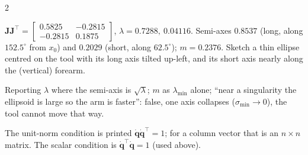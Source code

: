 \begin{multicols}{2}
\begin{worked}[equal links $L_1=L_2=0.5$ m, $q_2=110^\circ$ (any $q_1$)]
\end{worked}
\begin{worked}[$L=(0.5,0.4)$ m, $\mathbf q=(30^\circ,60^\circ)$: what to draw]
$\mathbf J\mathbf J^\top=\begin{bmatrix}0.5825&-0.2815\\-0.2815&0.1875\end{bmatrix}$, $\lambda=0.7288,\ 0.04116$. Semi-axes $0.8537$ (long, along $152.5^\circ$ from $x_0$) and $0.2029$ (short, along $62.5^\circ$); $m=0.2376$. Sketch a thin ellipse centred on the tool with its long axis tilted up-left, and its short axis nearly along the (vertical) forearm. \chk
\end{worked}
\begin{trap}
Reporting $\lambda$ where the semi-axis is $\sqrt\lambda$; $m$ as $\lambda_{\min}$ alone; ``near a singularity the ellipsoid is large so the arm is faster'': false, one axis collapses ($\sigma_{\min}\to0$), the tool cannot move that way.
\end{trap}
\begin{slideerr}[slide 51]
The unit-norm condition is printed $\dot{\mathbf q}\dot{\mathbf q}^\top=1$; for a column vector that is an $n\times n$ matrix. The scalar condition is $\dot{\mathbf q}^\top\dot{\mathbf q}=1$ (used above).
\end{slideerr}


\end{multicols}
